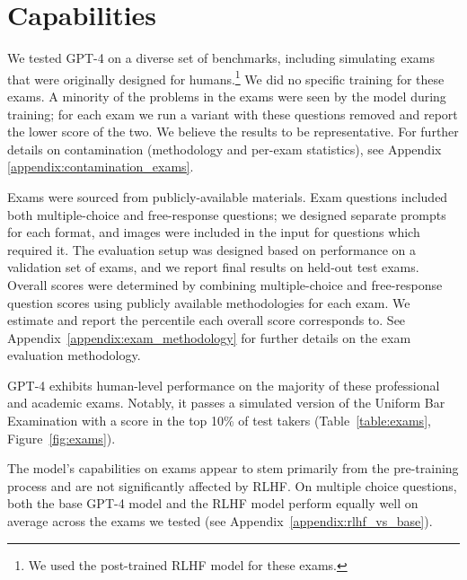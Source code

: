 \section{Capabilities}



We tested GPT-4 on a diverse set of benchmarks, including simulating exams that were originally designed for humans.\footnote{We used the post-trained RLHF model for these exams.} We did no specific training for these exams. A minority of the problems in the exams were seen by the model during training; for each exam we run a variant with these questions removed and report the lower score of the two. We believe the results to be representative. For further details on contamination (methodology and per-exam statistics), see Appendix \ref{appendix:contamination_exams}.

Exams were sourced from publicly-available materials. Exam questions included both multiple-choice and free-response questions; we designed separate prompts for each format, and images were included in the input for questions which required it. The evaluation setup was designed based on performance on a validation set of exams, and we report final results on held-out test exams. Overall scores were determined by combining multiple-choice and free-response question scores using publicly available methodologies for each exam. We estimate and report the percentile each overall score corresponds to. See Appendix~\ref{appendix:exam_methodology} for further details on the exam evaluation methodology.

GPT-4 exhibits human-level performance on the majority of these professional and academic exams. Notably, it passes a simulated version of the Uniform Bar Examination with a score in the top 10\% of test takers (Table~\ref{table:exams}, Figure~\ref{fig:exams}). 

The model's capabilities on exams appear to stem primarily from the pre-training process and are not significantly affected by RLHF. On multiple choice questions, both the base GPT-4 model and the RLHF model perform equally well on average across the exams we tested (see Appendix~\ref{appendix:rlhf_vs_base}).

